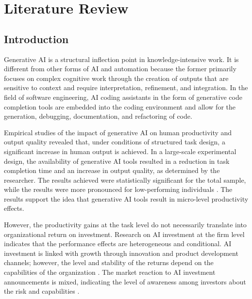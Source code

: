 \chapter{Literature Review} %
\label{cha:ch2_literature} %

\section{Introduction}
\label{sec:Introduction}

Generative AI is a structural inflection point in knowledge-intensive work. It is different from other forms of AI and automation because the former primarily focuses on complex cognitive work through the creation of outputs that are sensitive to context and require interpretation, refinement, and integration. In the field of software engineering, AI coding assistants in the form of generative code completion tools are embedded into the coding environment and allow for the generation, debugging, documentation, and refactoring of code.

Empirical studies of the impact of generative AI on human productivity and output quality revealed that, under conditions of structured task design, a significant increase in human output is achieved. In a large-scale experimental design, the availability of generative AI tools resulted in a reduction in task completion time and an increase in output quality, as determined by the researcher. The results achieved were statistically significant for the total sample, while the results were more pronounced for low-performing individuals \autocite{Noy2023}. The results support the idea that generative AI tools result in micro-level productivity effects.

However, the productivity gains at the task level do not necessarily translate into organizational return on investment. Research on AI investment at the firm level indicates that the performance effects are heterogeneous and conditional. AI investment is linked with growth through innovation and product development channels; however, the level and stability of the returns depend on the capabilities of the organization \autocite{Babina2024}. The market reaction to AI investment announcements is mixed, indicating the level of awareness among investors about the risk and capabilities \autocite{Lui2021}.

